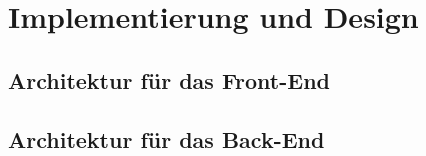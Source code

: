 \chapter{Implementierung und Design}
\label{sec:implementation}

\section{Architektur für das Front-End}

\section{Architektur für das Back-End}